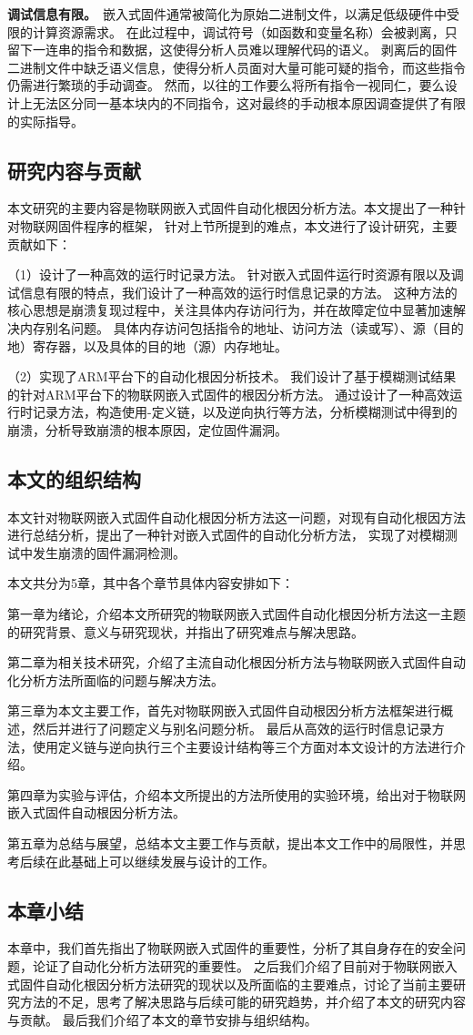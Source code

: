 \textbf{调试信息有限。}\ 嵌入式固件通常被简化为原始二进制文件，以满足低级硬件中受限的计算资源需求。
在此过程中，调试符号（如函数和变量名称）会被剥离，只留下一连串的指令和数据，这使得分析人员难以理解代码的语义。
剥离后的固件二进制文件中缺乏语义信息，使得分析人员面对大量可能可疑的指令，而这些指令仍需进行繁琐的手动调查。
然而，以往的工作要么将所有指令一视同仁，要么设计上无法区分同一基本块内的不同指令，这对最终的手动根本原因调查提供了有限的实际指导。

\subsection{研究内容与贡献}
本文研究的主要内容是物联网嵌入式固件自动化根因分析方法。本文提出了一种针对物联网固件程序的框架，
针对上节所提到的难点，本文进行了设计研究，主要贡献如下：

（1）设计了一种高效的运行时记录方法。
针对嵌入式固件运行时资源有限以及调试信息有限的特点，我们设计了一种高效的运行时信息记录的方法。
这种方法的核心思想是崩溃复现过程中，关注具体内存访问行为，并在故障定位中显著加速解决内存别名问题。
具体内存访问包括指令的地址、访问方法（读或写）、源（目的地）寄存器，以及具体的目的地（源）内存地址。

（2）实现了ARM平台下的自动化根因分析技术。
我们设计了基于模糊测试结果的针对ARM平台下的物联网嵌入式固件的根因分析方法。
通过设计了一种高效运行时记录方法，构造使用-定义链，以及逆向执行等方法，分析模糊测试中得到的崩溃，分析导致崩溃的根本原因，定位固件漏洞。

\subsection{本文的组织结构}
本文针对物联网嵌入式固件自动化根因分析方法这一问题，对现有自动化根因方法进行总结分析，提出了一种针对嵌入式固件的自动化分析方法，
实现了对模糊测试中发生崩溃的固件漏洞检测。

本文共分为5章，其中各个章节具体内容安排如下：

第一章为绪论，介绍本文所研究的物联网嵌入式固件自动化根因分析方法这一主题的研究背景、意义与研究现状，并指出了研究难点与解决思路。

第二章为相关技术研究，介绍了主流自动化根因分析方法与物联网嵌入式固件自动化分析方法所面临的问题与解决方法。

第三章为本文主要工作，首先对物联网嵌入式固件自动根因分析方法框架进行概述，然后并进行了问题定义与别名问题分析。
最后从高效的运行时信息记录方法，使用定义链与逆向执行三个主要设计结构等三个方面对本文设计的方法进行介绍。

第四章为实验与评估，介绍本文所提出的方法所使用的实验环境，给出对于物联网嵌入式固件自动根因分析方法。

第五章为总结与展望，总结本文主要工作与贡献，提出本文工作中的局限性，并思考后续在此基础上可以继续发展与设计的工作。

\subsection{本章小结}
本章中，我们首先指出了物联网嵌入式固件的重要性，分析了其自身存在的安全问题，论证了自动化分析方法研究的重要性。
之后我们介绍了目前对于物联网嵌入式固件自动化根因分析方法研究的现状以及所面临的主要难点，讨论了当前主要研究方法的不足，思考了解决思路与后续可能的研究趋势，并介绍了本文的研究内容与贡献。
最后我们介绍了本文的章节安排与组织结构。